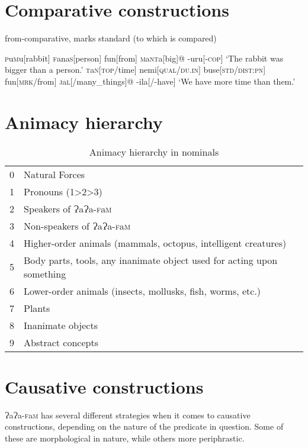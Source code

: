 \documentclass[a4paper,10pt,twoside,openright]{memoir}
\newcommand{\lang}{{\bigglot}a{\bigglot}a-\textsc{f}a\textsc{m}}
\newcommand{\bigglot}{Ɂ}
\newcommand{\famwordold}[5]{#1\textsc{#2}#3\textsc{#4}#5}
\begin{document}
\section{Comparative constructions}

from-comparative, marks standard (to which is compared)

\pex[interpartskip=3ex]
\a
\begingl
\famwordold{}{p}{u}{m}{u}[rabbit]
\famwordold{}{f}{ana}{s}{}[person]
fun[from]
\famwordold{}{m}{a}{nt}{a}[big]@
-uru[\textsc{-cop}]
\glft `The rabbit was bigger than a person.'
\endgl
\a
\begingl
\famwordold{}{t}{a}{n}{}[\textsc{top}/time]
nemi[\textsc{qual}/\textsc{du.in}]
buse[\textsc{std}/\textsc{dist:pn}]
fun[\textsc{mrk}/from]
\famwordold{}{j}{a}{l}{}[/many\_things]@
-ila[/-have]
\glft `We have more time than them.'
\endgl
\xe

\section{Animacy hierarchy}

\begin{table}[ht]
    \centering
    \begin{tabular}{ll}
    0 & Natural Forces \\
    1 & Pronouns (1>2>3) \\
    2 & Speakers of \lang{} \\
    3 & Non-speakers of \lang{} \\
    4 & Higher-order animals (mammals, octopus, intelligent creatures) \\
    5 & \parbox[t]{7cm}{Body parts, tools, any inanimate object used for acting upon something} \\
    6 & Lower-order animals (insects, mollusks, fish, worms, etc.) \\
    7 & Plants \\
    8 & Inanimate objects \\
    9 & Abstract concepts 
    \end{tabular}
    \caption{Animacy hierarchy in nominals}
    \label{tab:hierarchy}
\end{table}

\section{Causative constructions}

\lang{} has several different strategies when it comes to causative constructions, depending on the nature of the predicate in question. Some of these are morphological in nature, while others more periphrastic. 
\end{document}
